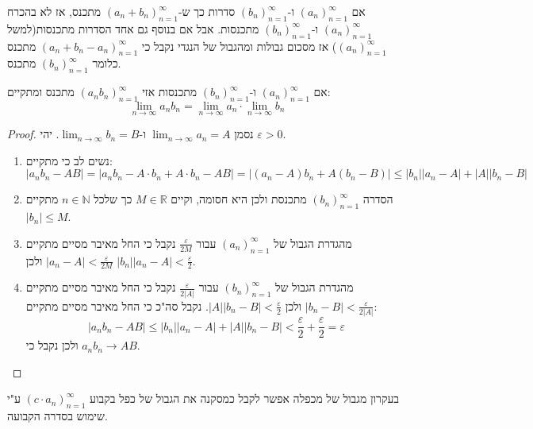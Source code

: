 \documentclass{tstextbook}
\begin{document}
\begin{remark}
אם \((a_n)_{n=1}^\infty\) ו-\((b_{n})_{n=1}^\infty\) סדרות כך ש-\((a_n+b_{n})_{n=1}^\infty\) מתכנס, אז לא בהכרח \((a_n)_{n=1}^\infty\) ו-\((b_{n})_{n=1}^\infty\) מתכנסות. אבל אם בנוסף גם אחד הסדרות מתכנסות(למשל \((a_n)_{n=1}^\infty\)) אז מסכום גבולות ומהגבול של הנגדי נקבל כי \((a_n+b_{n}-a_{n})_{n=1}^\infty\) מתכנס כלומר \((b_n)_{n=1}^\infty\) מתכנס.

\end{remark}
\begin{theorem}
אם \((a_n)_{n=1}^\infty\) ו-\((b_n)_{n=1}^\infty\) מתכנסות אזי \((a_nb_{n})_{n=1}^\infty\) מתכנס ומתקיים:
$$\lim_{ n \to \infty } a_{n}b_{n}=\lim_{ n \to \infty } a_{n}  \cdot\lim_{ n \to \infty } b_{n}$$

\end{theorem}
\begin{proof}
נסמן \(\lim_{ n \to \infty }a_{n}=A\) ו-\(\lim_{ n \to \infty }b_{n}=B\). יהי \(\varepsilon>0\).

  \begin{enumerate}
    \item נשים לב כי מתקיים: 
$$|a_{n}b_{n}-AB|=|a_{n}b_{n}-A\cdot b_{n}+A\cdot b_{n}-AB|=|(a_{n}-A)b_{n}+A(b_{n}-B)|\leq|b_{n}||a_{n}-A|+|A||b_{n}-B|$$


    \item הסדרה \((b_n)_{n=1}^\infty\) מתכנסת ולכן היא חסומה, וקיים \(M \in \mathbb{R}\) כך שלכל \(n \in \mathbb{N}\) מתקיים \(|b_{n}|\leq M\). 


    \item מהגדרת הגבול של \((a_n)_{n=1}^\infty\) עבור \(\frac{\varepsilon}{2M}\) נקבל כי החל מאיבר מסיים מתקיים \(|a_{n}-A|<\frac{\varepsilon}{2M}\) ולכן \(|b_{n}||a_{n}-A|<\frac{\varepsilon}{2}\). 


    \item מהגדרת הגבול של \((b_n)_{n=1}^\infty\) עבור \(\frac{\varepsilon}{2|A|}\) נקבל כי החל מאיבר מסיים מתקיים \(|b_{n}-B|<\frac{\varepsilon}{2|A|}\) ולכן \(|A||b_{n}-B|<\frac{\varepsilon}{2}\). 
נקבל סה"כ כי החל מאיבר מסיים מתקיים:
$$|a_{n}b_{n}-AB|\leq |b_{n}||a_{n}-A|+|A||b_{n}-B|< \frac{\varepsilon}{2}+\frac{\varepsilon}{2}=\varepsilon$$
ולכן נקבל כי \(a_{n}b_{n}\to AB\).


  \end{enumerate}
\end{proof}
\begin{remark}
בעקרון מגבול של מכפלה אפשר לקבל כמסקנה את הגבול של כפל בקבוע \(\left( c\cdot a_n \right)_{n=1}^\infty\) ע"י שימוש בסדרה הקבועה.

\end{remark}
\end{document}
